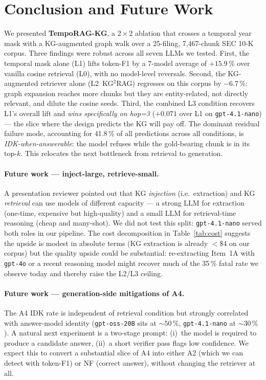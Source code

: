 \documentclass[11pt]{article}
\begin{document}
\section{Conclusion and Future Work}
\label{sec:conclusion}

We presented \textbf{TempoRAG-KG}, a $2\times2$ ablation that crosses a
temporal year mask with a KG-augmented graph walk over a 25-filing,
7{,}467-chunk SEC 10-K corpus. Three findings were robust across all
seven LLMs we tested. First, the temporal mask alone (L1) lifts
token-F1 by a 7-model average of $+15.9\,\%$ over vanilla
cosine retrieval (L0), with no model-level reversals. Second, the
KG-augmented retriever alone (L2~KG$^{2}$RAG) regresses on this
corpus by $-6.7\,\%$: graph expansion reaches more chunks but they are
entity-related, not directly relevant, and dilute the cosine seeds.
Third, the combined L3 condition recovers L1's overall lift and
\emph{wins specifically on hop=3} ($+0.071$ over L1 on
\texttt{gpt-4.1-nano}) --- the slice where the design predicts the
KG will pay off. The dominant residual failure mode, accounting for
41.8\,\% of all predictions across all conditions, is
\emph{IDK-when-answerable}: the model refuses while the gold-bearing
chunk is in its top-$k$. This relocates the next bottleneck from
retrieval to generation.

\paragraph{Future work --- inject-large, retrieve-small.}
A presentation reviewer pointed out that KG \emph{injection} (i.e.\
extraction) and KG \emph{retrieval} can use models of different
capacity --- a strong LLM for extraction (one-time, expensive but
high-quality) and a small LLM for retrieval-time reasoning (cheap and
many-shot). We did not test this split: \texttt{gpt-4.1-nano} served
both roles in our pipeline. The cost decomposition in
Table~\ref{tab:cost} suggests the upside is modest in absolute terms
(KG extraction is already $<\!\$4$ on our corpus) but the quality
upside could be substantial: re-extracting Item~1A with
\texttt{gpt-4o} or a recent reasoning model might recover much of the
35\,\% fatal rate we observe today and thereby raise the L2/L3
ceiling.

\paragraph{Future work --- generation-side mitigations of A4.}
The A4 IDK rate is independent of retrieval condition but strongly
correlated with answer-model identity (\texttt{gpt-oss-20B} sits at
$\sim 50\,\%$, \texttt{gpt-4.1-nano} at $\sim 30\,\%$). A natural next
experiment is a two-stage prompt: (i)~the model is required to
produce a candidate answer, (ii)~a short verifier pass flags low
confidence. We expect this to convert a substantial slice of A4 into
either A2 (which we can detect with token-F1) or NF (correct answer),
without changing the retriever at all.
\end{document}
